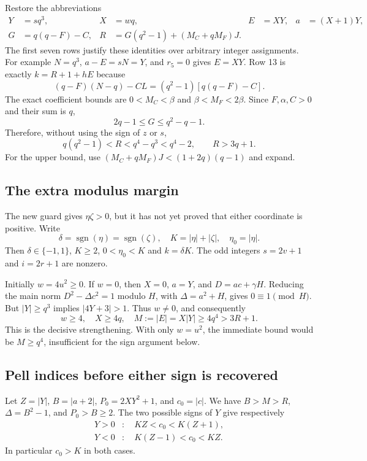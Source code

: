 \documentclass[11pt,a4paper]{article}
\theoremstyle{remark}\newtheorem{remark}[theorem]{Remark}
\newcommand{\sgn}{\operatorname{sgn}}
\begin{document}
Restore the abbreviations
\begin{align*}
Y&=sq^3,&X&=wq,&E&=XY,&a&=(X+1)Y,\\
G&=q(q-F)-C,&
R&=G(q^2-1)+(M_C+qM_F)J.
\end{align*}
The first seven rows justify these identities over arbitrary integer
assignments. For example $N=q^3$, $a-E=sN=Y$, and $r_5=0$ gives
$E=XY$. Row 13 is exactly $k=R+1+hE$ because
\[
 (q-F)(N-q)-CL=(q^2-1)[q(q-F)-C].
\]
The exact coefficient bounds are
$0<M_C<\beta$ and $\beta<M_F<2\beta$.
Since $F,\alpha,C>0$ and their sum is $q$,
\[
 2q-1\le G\le q^2-q-1.
\]
Therefore, without using the sign of $z$ or $s$,
\begin{equation}
 q(q^2-1)<R<q^4-q^3<q^4-2,
 \qquad R>3q+1.
 \label{eq:Rbounds}
\end{equation}
For the upper bound, use
$(M_C+qM_F)J<(1+2q)(q-1)$ and expand.

\subsection{The extra modulus margin}

The new guard gives $\eta\zeta>0$, but it has not yet proved that
either coordinate is positive. Write
\[
 \delta=\sgn(\eta)=\sgn(\zeta),\quad
 K=|\eta|+|\zeta|,\quad \eta_0=|\eta|.
\]
Then $\delta\in\{-1,1\}$, $K\ge2$, $0<\eta_0<K$ and $k=\delta K$.
The odd integers $s=2v+1$ and $i=2r+1$ are nonzero.

Initially $w=4u^2\ge0$. If $w=0$, then $X=0$, $a=Y$, and
$D=ac+\gamma H$. Reducing the main norm
$D^2-\Delta c^2=1$ modulo $H$, with $\Delta=a^2+H$, gives
$0\equiv1\pmod H$. But $|Y|\ge q^3$ implies $|4Y+3|>1$.
Thus $w\ne0$, and consequently
\begin{equation}
 w\ge4,\quad X\ge4q,\quad
 M:=|E|=X|Y|\ge4q^4>3R+1.
 \label{eq:modulus}
\end{equation}
This is the decisive strengthening. With only $w=u^2$, the immediate
bound would be $M\ge q^4$, insufficient for the sign argument below.

\subsection{Pell indices before either sign is recovered}

Let $Z=|Y|$, $B=|a+2|$, $P_0=2XY^2+1$, and $c_0=|c|$.
We have $B>M>R$, $\Delta=B^2-1$, and $P_0>B\ge2$.
The two possible signs of $Y$ give respectively
\begin{align*}
 Y>0&:\quad KZ<c_0<K(Z+1),\\
 Y<0&:\quad K(Z-1)<c_0<KZ.
\end{align*}
In particular $c_0>K$ in both cases.
\end{document}
